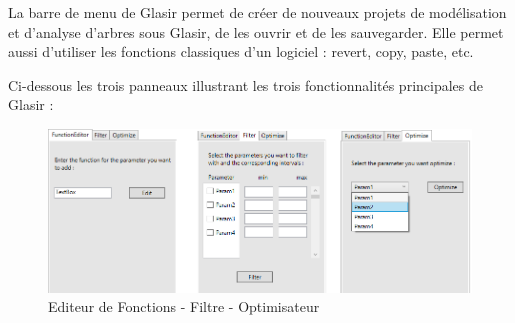 La barre de menu de Glasir permet de créer de nouveaux projets de modélisation et d'analyse d'arbres sous Glasir, de les ouvrir et de les sauvegarder. Elle permet aussi d'utiliser les fonctions classiques d'un logiciel : revert, copy, paste, etc.

Ci-dessous les trois panneaux illustrant les trois fonctionnalités principales de Glasir :

   \begin{figure}[h!]
        \centering
        \includegraphics[height=0.4\textwidth]{figure/ongletsGlasir.png}
        \caption{Editeur de Fonctions - Filtre - Optimisateur}
        \label{fig:interface}
    \end{figure}